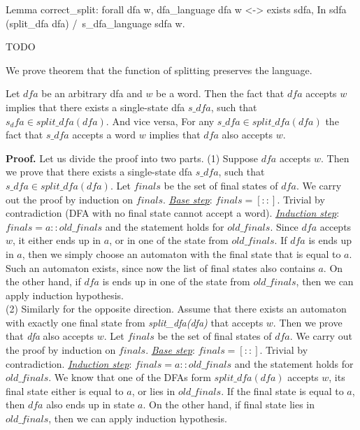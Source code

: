 



\begin{listing}[h]
    \begin{pyglist}[language=coq, numbers=none, numbersep=5pt]
  Lemma correct_split:
    forall dfa w,
      dfa_language dfa w <->
      exists sdfa, 
         In sdfa (split_dfa dfa) /\ 
         s_dfa_language sdfa w.
    \end{pyglist}
    \caption{TODO}
    \label{lst:verbments1}
\end{listing}

We prove theorem that the function of splitting preserves the language.

\begin{theorem}
  Let $dfa$ be an arbitrary dfa and $w$ be a word. Then the fact that $dfa$ accepts $w$ implies that there exists a single-state dfa $s\_dfa$, such that $s_dfa \in split\_dfa(dfa)$. And vice versa, For any $s\_dfa \in split\_dfa(dfa)$ the fact that $s\_dfa$ accepts a word $w$ implies that $dfa$ also accepts $w$.
\end{theorem}

\textbf{Proof.}
Let us divide the proof into two parts.
(1) Suppose $dfa$ accepts $w$. Then we prove that there exists a single-state dfa $s\_dfa$, such that $s\_dfa \in split\_dfa(dfa)$. 
Let $finals$ be the set of final states of $dfa$. We carry out the proof by induction on $finals$. 
\textit{\underline{Base step}}: $finals = [::]$. Trivial by contradiction (DFA with no final state cannot accept a word). \textit{\underline{Induction step}}: $finals = a::old\_finals$ and the statement holds for $old\_finals$. Since $dfa$ accepts $w$, it either ends up in $a$, or in one of the state from $old\_finals$.
If $dfa$ is ends up in $a$, then we simply choose an automaton with the final state that is equal to $a$. Such an automaton exists, since now the list of final states also contains $a$. On the other hand, if $dfa$ is ends up in one of the state from $old\_finals$, then we can apply induction hypothesis. \\
(2) Similarly for the opposite direction. Assume that there exists an automaton with exactly one final state from \textit{split\_dfa(dfa)} that accepts $w$. Then we prove that \textit{dfa} also accepts $w$. 
Let $finals$ be the set of final states of $dfa$. We carry out the proof by induction on $finals$. 
\textit{\underline{Base step}}: $finals = [::]$. Trivial by contradiction. \textit{\underline{Induction step}}: $finals = a::old\_finals$ and the statement holds for $old\_finals$. We know that one of the DFAs form $split\_dfa(dfa)$ accepts $w$, its final state either is equal to $a$, or lies in $old\_finals$.
If the final state is equal to $a$, then $dfa$ also ends up in state $a$.  On the other hand, if final state lies in $old\_finals$, then we can apply induction hypothesis.



